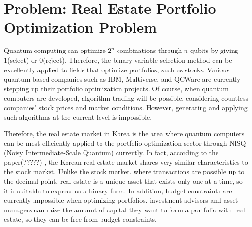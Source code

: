 \clearpage
\section{Problem: Real Estate Portfolio Optimization Problem}


Quantum computing can optimize $2^n$ combinations through $n$ qubits by giving 1(select) or 0(reject). Therefore, the binary variable selection method can be excellently applied to fields that optimize portfolios, such as stocks. Various quantum-based companies such as IBM, Multiverse, and QCWare are currently stepping up their portfolio optimization projects. Of course, when quantum computers are developed, algorithm trading will be possible, considering countless companies' stock prices and market conditions. However, generating and applying such algorithms at the current level is impossible.

Therefore, the real estate market in Korea is the area where quantum computers can be most efficiently applied to the portfolio optimization sector through NISQ (Noisy Intermediate-Scale Quantum) currently. In fact, according to the paper(?????) , the Korean real estate market shares very similar characteristics to the stock market. Unlike the stock market, where transactions are possible up to the decimal point, real estate is a unique asset that exists only one at a time, so it is suitable to express as a binary form. In addition, budget constraints are currently impossible when optimizing portfolios.  investment advisors and asset managers can raise the amount of capital they want to form a portfolio with real estate, so they can be free from budget constraints.








\clearpage